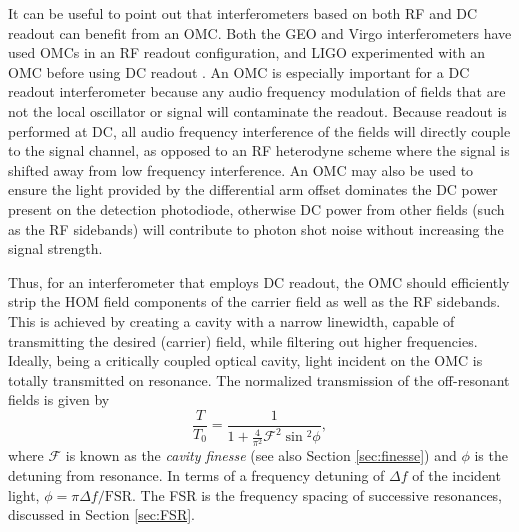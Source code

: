 It can be useful to point out that interferometers based on both RF and DC readout can benefit from an OMC. %
Both the GEO and Virgo interferometers have used OMCs in an RF readout configuration, and LIGO experimented with an OMC before using DC readout \cite{G040326}. %
An OMC is especially important for a DC readout interferometer because any audio frequency modulation of fields that are not the local oscillator or signal will contaminate the readout. %
Because readout is performed at DC, all audio frequency interference of the fields will directly couple to the signal channel, as opposed to an RF heterodyne scheme where the signal is shifted away from low frequency interference. %
An OMC may also be used to ensure the light provided by the differential arm offset dominates the DC power present on the detection photodiode, otherwise DC power from other fields (such as the RF sidebands) will contribute to photon shot noise without increasing the signal strength. %


Thus, for an interferometer that employs DC readout, the OMC should efficiently strip the HOM field components of the carrier field as well as the RF sidebands. %
This is achieved by creating a cavity with a narrow linewidth, capable of transmitting the desired (carrier) field, while filtering out higher frequencies. %
Ideally, being a critically coupled optical cavity, light incident on the OMC is totally transmitted on resonance. %
The normalized transmission of the off-resonant fields is given by
\begin{equation}
\label{eqn:finesse}
\frac{T}{T_0}=\frac{1}{1+\frac{4}{\pi^2}\mathcal{F}^2\sin{}^2\phi},
\end{equation}
where $\mathcal{F}$ is known as the \emph{cavity finesse} (see also Section \ref{sec:finesse}) and $\phi$ is the detuning from resonance. %
In terms of a frequency detuning of $\Delta f$ of the incident light, $\phi = \pi \Delta f / \mathrm{FSR}$. %
The FSR is the frequency spacing of successive resonances, discussed in Section \ref{sec:FSR}.

